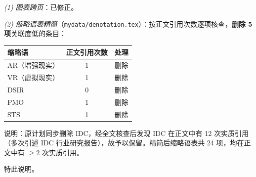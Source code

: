 \documentclass[11pt,a4paper]{ctexart}
\begin{document}
\emph{(1) 图表跨页}：已修正。

\emph{(2) 缩略语表精简}（\texttt{mydata/denotation.tex}）：按正文引用次数逐项核查，\textbf{删除 5 项}关联度低的条目：

\begin{center}
\fontsize{9}{11}\selectfont
\begin{tabular}{lcc}
\toprule
\textbf{缩略语} & \textbf{正文引用次数} & \textbf{处理} \\
\midrule
AR（增强现实） & 1 & 删除 \\
VR（虚拟现实） & 1 & 删除 \\
DSIR           & 0 & 删除 \\
PMO            & 1 & 删除 \\
STS            & 1 & 删除 \\
\bottomrule
\end{tabular}
\end{center}

说明：原计划同步删除 IDC，经全文核查后发现 IDC 在正文中有 12 次实质引用（多次引述 IDC 行业研究报告），故予以保留。精简后缩略语表共 24 项，均在正文中有 $\geq 2$ 次实质引用。

\vspace{1em}
\hfill 特此说明。
\end{document}
